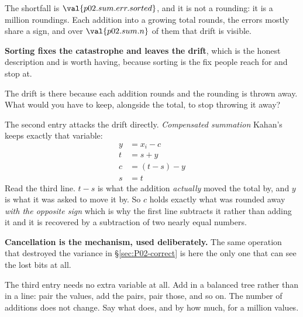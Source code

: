 \begin{fr}
The shortfall is $\val{p02.sum.err.sorted}$, and it is not a rounding: it is a
million roundings. Each addition into a growing total rounds, the errors mostly
share a sign, and over $\val{p02.sum.n}$ of them that drift is visible.

\textbf{Sorting fixes the catastrophe and leaves the drift}, which is the
honest description and is worth having, because sorting is the fix people reach
for and stop at.

The drift is there because each addition rounds and the rounding is thrown
away. What would you have to keep, alongside the total, to stop throwing it
away?
\dotline
\nextframe
\end{fr}

\begin{fr}

The second entry attacks the drift directly. \emph{Compensated summation}
\dash{} Kahan's \dash{} keeps exactly that variable:
\begin{align*}
  y &= x_i - c \\
  t &= s + y \\
  c &= (t - s) - y \\
  s &= t
\end{align*}
Read the third line. $t - s$ is what the addition \emph{actually} moved the
total by, and $y$ is what it was asked to move it by. So $c$ holds exactly what
was rounded away \emph{with the opposite sign} \dash{} which is why the first
line subtracts it rather than adding it \dash{} and it is recovered by a
subtraction of two nearly equal numbers.

\textbf{Cancellation is the mechanism, used deliberately.} The same operation
that destroyed the variance in \S\ref{sec:P02-correct} is here the only one
that can see the lost bits at all.

The third entry needs no extra variable at all. Add in a balanced tree rather
than in a line: pair the values, add the pairs, pair those, and so on. The
number of additions does not change. Say what does, and by how much, for a
million values.
\dotline
\nextframe
\end{fr}

